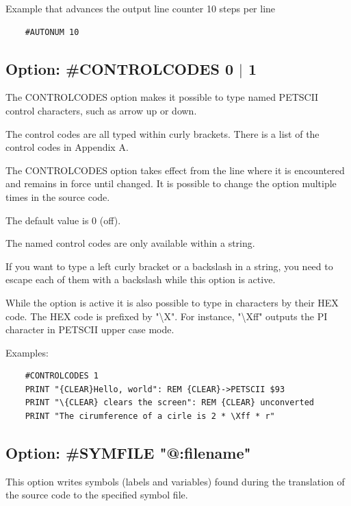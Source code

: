 \documentclass{article}
\begin{document}
        Example that advances the output line counter 10 steps per line
        \begin{verbatim}
    #AUTONUM 10
        \end{verbatim}

    \subsection{Option: \#CONTROLCODES 0 $|$ 1}
        The CONTROLCODES option makes it possible to type
        named PETSCII control characters, such as arrow up or
        down.

        The control codes are all typed within curly brackets. There
        is a list of the control codes in Appendix A. 

        The CONTROLCODES option takes effect from the line
        where it is encountered and remains in force until
        changed. It is possible to change the
        option multiple times in the source code.

        The default value is 0 (off).

        The named control codes are only available
        within a string.

        If you want to type a left curly bracket or a 
        backslash in a string, you need to escape each of them with 
        a backslash while this option is active.

        While the option is active it is also possible
        to type in characters by their HEX code. The HEX code is
        prefixed by "\textbackslash X". For instance, "\textbackslash Xff" outputs the PI character
        in PETSCII upper case mode.
    
        Examples:

    \begin{verbatim}
    #CONTROLCODES 1
    PRINT "{CLEAR}Hello, world": REM {CLEAR}->PETSCII $93
    PRINT "\{CLEAR} clears the screen": REM {CLEAR} unconverted
    PRINT "The cirumference of a cirle is 2 * \Xff * r"
    \end{verbatim}

    \subsection{Option: \#SYMFILE "@:filename"}

        This option writes symbols (labels and variables) found during the
        translation of the source code to the specified
        symbol file.
\end{document}
